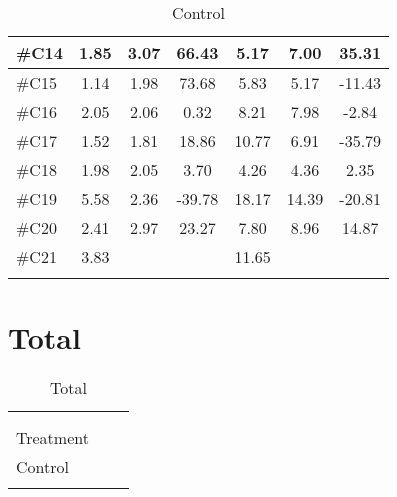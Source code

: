 \begin{longtable} {l|c|c|c|c|c|c}
\#C14 & 1.85 & 3.07 & 	66.43	 & 5.17 & 7.00 & 35.31 \\ \hline
\#C15 & 1.14 & 1.98 & 	73.68 & 5.83 & 5.17 & -11.43 \\ \hline
\#C16 & 2.05 & 2.06 & 	0.32 & 8.21 & 7.98 & -2.84 \\ \hline
\#C17 & 1.52 & 1.81 &	18.86 & 10.77 & 6.91 & -35.79 \\ \hline
\#C18 & 1.98 & 2.05 & 	3.70 & 4.26  &  4.36 & 2.35 \\ \hline
\#C19 & 5.58 & 2.36 & 	-39.78 & 18.17 & 14.39 & -20.81 \\ \hline
\#C20 & 2.41 & 2.97 &  23.27 & 7.80 &  8.96 & 14.87\\ \hline
\#C21 & 3.83 &  &  & 11.65 & & \\ \hline
	\caption{Control}
	\label{tab:Control}
\end{longtable}
\vspace{-.5cm}



\section{Total}
\begin{longtable} {l|c|c}
 \rowcolor[HTML]{C0C0C0} 
  \color[HTML]{000000}{} & 
\color[HTML]{000000}{\textbf{Threshold}} & \color[HTML]{000000}{\textbf{Tolerance}} 	\\  \rule{0pt}{3ex} 
\cellcolor[HTML]{C0C0C0}{} &
 \cellcolor[HTML]{C0C0C0}{Difference [\%]} &  \cellcolor[HTML]{C0C0C0}{Difference [\%]} \\ \hline
Treatment & &  \\ \hline
Control & &  \\ \hline
	\caption{Total}
	\label{tab:Total}
\end{longtable}
\vspace{-.5cm}